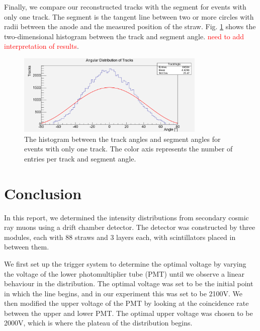 \documentclass[a4paper]{report}
\numberwithin{equation}{section}
\begin{document}

Finally, we compare our reconstructed tracks with the segment for events with only one track. 
The segment is the tangent line between two or more circles with radii between the anode and the measured position of the straw. 
Fig. \ref{fig:trackvssegment} shows the two-dimensional histogram between the track and segment angle. \textcolor{red}{need to add interpretation of results}.

\begin{figure}[!h]
	\centering
	\includegraphics[width=0.8\textwidth]{trackangle_cos2fit.png}
	\caption{The histogram between the track angles and segment angles for events with only one track. The 
	color axis represents the number of entries per track and segment angle. }
	\label{fig:trackvssegment}
\end{figure}

\chapter{Conclusion} \label{chap:concl}

In this report, we determined the intensity distributions from secondary cosmic ray muons using a drift chamber detector. 
The detector was constructed by three modules, each with 88 straws and 3 layers each, with scintillators placed in between them. \par 

We first set up the trigger system to determine the optimal voltage by varying the voltage of the lower photomultiplier tube (PMT) 
until we observe a linear behaviour in the distribution. The optimal voltage was set to be the initial point in which the line begins, and
in our experiment this was set to be 2100V. We then modified the upper voltage of the PMT by looking at the coincidence rate between the 
upper and lower PMT. The optimal upper voltage was chosen to be 2000V, which is where the plateau of the distribution begins. \par 
\end{document}
